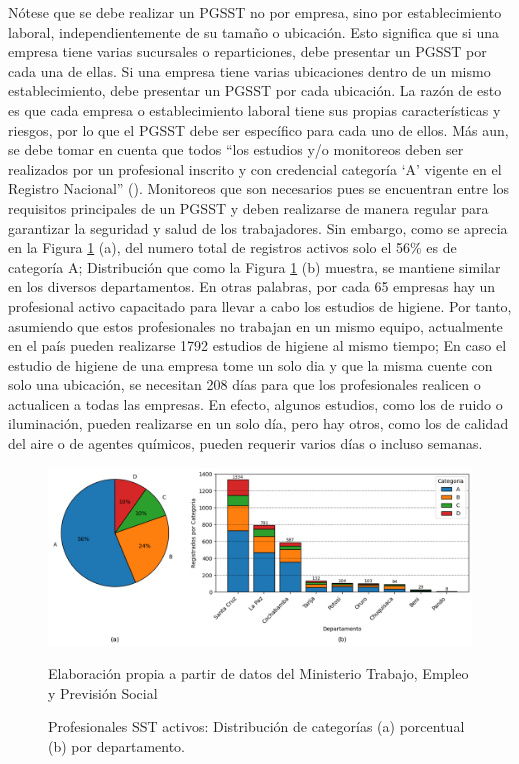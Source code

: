Nótese que se debe realizar un PGSST no por empresa, sino por establecimiento laboral, independientemente de su tamaño o ubicación. Esto significa que si una empresa tiene varias sucursales o reparticiones, debe presentar un PGSST por cada una de ellas. Si una empresa tiene varias ubicaciones dentro de un mismo establecimiento, debe presentar un PGSST por cada ubicación. La razón de esto es que cada empresa o establecimiento laboral tiene sus propias características y riesgos, por lo que el PGSST debe ser específico para cada uno de ellos. 
Más aun, se debe tomar en cuenta que todos ``los estudios y/o monitoreos deben ser realizados por un profesional inscrito y con credencial categoría `A' vigente en el Registro Nacional'' (\cite{NTS-009/23}). Monitoreos que son necesarios pues se encuentran entre los requisitos principales de un PGSST y deben realizarse de manera regular para garantizar la seguridad y salud de los trabajadores. Sin embargo, como se aprecia en la Figura \ref{fig:profesionales_syso_por_categoria} (a), del numero total de registros activos solo el 56\% es de categoría A; Distribución que como la Figura \ref{fig:profesionales_syso_por_categoria} (b) muestra, se mantiene similar en los diversos departamentos. En otras palabras, por cada 65 empresas hay un profesional activo capacitado para llevar a cabo los estudios de higiene. Por tanto, asumiendo que estos profesionales no trabajan en un mismo equipo, actualmente en el país pueden realizarse 1792 estudios de higiene al mismo tiempo; En caso el estudio de higiene de una empresa tome un solo dia y que la misma cuente con solo una ubicación, se necesitan 208 días para que los profesionales realicen o actualicen a todas las empresas. En efecto, algunos estudios, como los de ruido o iluminación, pueden realizarse en un solo día, pero hay otros, como los de calidad del aire o de agentes químicos, pueden requerir varios días o incluso semanas.  

\begin{figure}[htb]
	\centering
	\includegraphics[width=\textwidth]{images/marcoref/profesionales_syso_por_categoria.png}
	\caption{Profesionales SST activos: Distribución de categorías (a) porcentual (b) por departamento.} \vspace{-0.2cm}
	\footnotesize{Elaboración propia a partir de datos del Ministerio Trabajo, Empleo y Previsión Social}
	\label{fig:profesionales_syso_por_categoria} 
\end{figure}

